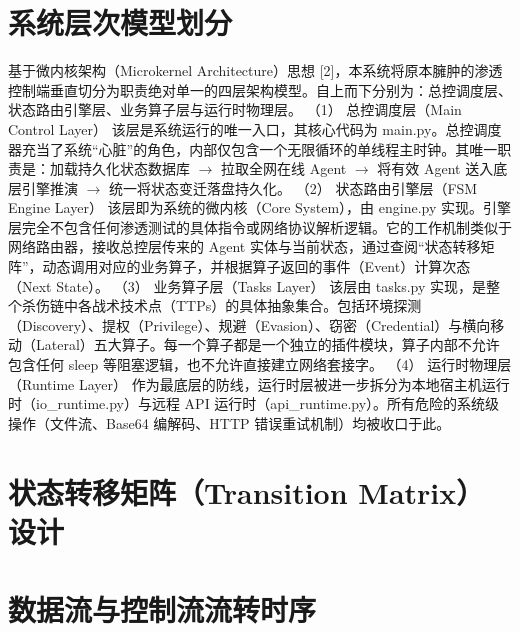 \documentclass[twoside,openright]{xduugthesis}
\begin{document}
\section{系统层次模型划分}

基于微内核架构（Microkernel Architecture）思想 [2]，本系统将原本臃肿的渗透控制端垂直切分为职责绝对单一的四层架构模型。自上而下分别为：总控调度层、状态路由引擎层、业务算子层与运行时物理层。
（1） 总控调度层（Main Control Layer）
该层是系统运行的唯一入口，其核心代码为 main.py。总控调度器充当了系统“心脏”的角色，内部仅包含一个无限循环的单线程主时钟。其唯一职责是：加载持久化状态数据库 $\rightarrow$ 拉取全网在线 Agent $\rightarrow$ 将有效 Agent 送入底层引擎推演 $\rightarrow$ 统一将状态变迁落盘持久化。
（2） 状态路由引擎层（FSM Engine Layer）
该层即为系统的微内核（Core System），由 engine.py 实现。引擎层完全不包含任何渗透测试的具体指令或网络协议解析逻辑。它的工作机制类似于网络路由器，接收总控层传来的 Agent 实体与当前状态，通过查阅“状态转移矩阵”，动态调用对应的业务算子，并根据算子返回的事件（Event）计算次态（Next State）。
（3） 业务算子层（Tasks Layer）
该层由 tasks.py 实现，是整个杀伤链中各战术技术点（TTPs）的具体抽象集合。包括环境探测（Discovery）、提权（Privilege）、规避（Evasion）、窃密（Credential）与横向移动（Lateral）五大算子。每一个算子都是一个独立的插件模块，算子内部不允许包含任何 sleep 等阻塞逻辑，也不允许直接建立网络套接字。
（4） 运行时物理层（Runtime Layer）
作为最底层的防线，运行时层被进一步拆分为本地宿主机运行时（io_runtime.py）与远程 API 运行时（api_runtime.py）。所有危险的系统级操作（文件流、Base64 编解码、HTTP 错误重试机制）均被收口于此。

\section{状态转移矩阵（Transition Matrix）设计}

\section{数据流与控制流流转时序}
\end{document}
